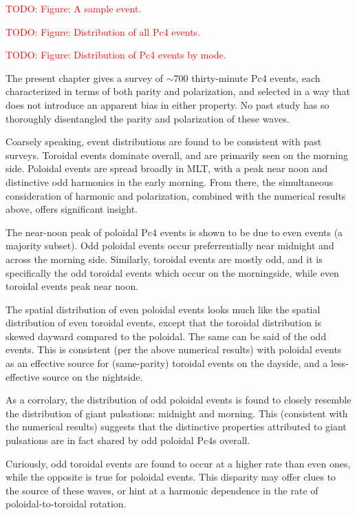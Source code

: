 \documentclass{article}
\newcommand{\about}{\ensuremath{\sim}}
\newcommand{\todo}[1]{ \textcolor{red}{TODO: #1} }
\begin{document}
\todo{Figure: A sample event.}

\todo{Figure: Distribution of all Pc4 events.}

\todo{Figure: Distribution of Pc4 events by mode.}

The present chapter gives a survey of \about700 thirty-minute Pc4
events, each characterized in terms of both parity and polarization, and
selected in a way that does not introduce an apparent bias in either
property. No past study has so thoroughly disentangled the parity and
polarization of these waves.

Coarsely speaking, event distributions are found to be consistent with
past surveys. Toroidal events dominate overall, and are primarily seen
on the morning side. Poloidal events are spread broadly in MLT, with a
peak near noon and distinctive odd harmonics in the early morning. From
there, the simultaneous consideration of harmonic and polarization,
combined with the numerical results above, offers significant insight. 

The near-noon peak of poloidal Pc4 events is shown to be due to even
events (a majority subset). Odd poloidal events occur preferrentially
near midnight and across the morning side. Similarly, toroidal events
are mostly odd, and it is specifically the odd toroidal events which
occur on the morningside, while even toroidal events peak near noon. 

The spatial distribution of even poloidal events looks much like the
spatial distribution of even toroidal events, except that the toroidal
distribution is skewed dayward compared to the poloidal. The same can be
said of the odd events. This is consistent (per the above numerical
results) with poloidal events as an effective source for (same-parity)
toroidal events on the dayside, and a less-effective source on the
nightside. 

As a corrolary, the distribution of odd poloidal events is found to
closely resemble the distribution of giant pulsations: midnight and
morning. This (consistent with the numerical results) suggests that the
distinctive properties attributed to giant pulsations are in fact shared
by odd poloidal Pc4s overall. 

Curiously, odd toroidal events are found to occur at a higher rate than
even ones, while the opposite is true for poloidal events. This
disparity may offer clues to the source of these waves, or hint at a
harmonic dependence in the rate of poloidal-to-toroidal rotation. 

\end{document}
